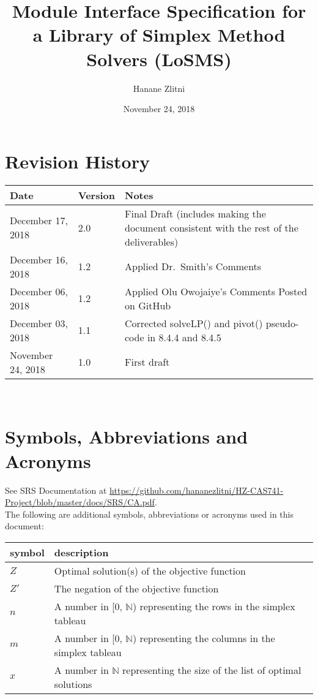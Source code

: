 \documentclass[12pt, titlepage]{article}
\newcommand{\progname}{Library of Simplex Method Solvers}
\newcommand{\famname}{LoSMS}
\begin{document}
\title{Module Interface Specification for a \progname{} (\famname{})}

\author{Hanane Zlitni}

\date{November 24, 2018}

\maketitle


\section{Revision History}

\begin{tabularx}{\textwidth}{p{3cm}p{2cm}X}
\toprule {\bf Date} & {\bf Version} & {\bf Notes}\\
\midrule
December 17, 2018 & 2.0 & Final Draft (includes making the document consistent 
with the rest of the deliverables)\\
December 16, 2018 & 1.2 & Applied Dr.~Smith’s Comments\\
December 06, 2018 & 1.2 & Applied Olu Owojaiye's Comments Posted on GitHub\\
December 03, 2018 & 1.1 & Corrected solveLP() and pivot() pseudo-code in 8.4.4 
and 8.4.5\\
November 24, 2018 & 1.0 & First draft\\
\bottomrule
\end{tabularx}

~\newpage

\section{Symbols, Abbreviations and Acronyms}

See SRS Documentation at 
\url{https://github.com/hananezlitni/HZ-CAS741-Project/blob/master/docs/SRS/CA.pdf}.
 \\

The following are additional symbols, abbreviations or acronyms used in this 
document: \\

\renewcommand{\arraystretch}{1.2}
\begin{tabular}{l l} 
	\toprule		
	\textbf{symbol} & \textbf{description}\\
	\midrule 
	$Z$ & Optimal solution(s) of the objective function\\
	$Z'$ & The negation of the objective function\\
	$n$ & A number in [0, $\mathbb{N}$) representing the rows in the simplex 
	tableau \\
	$m$ & A number in [0, $\mathbb{N}$) representing the columns in the 
	simplex tableau \\
	$x$ & A number in $\mathbb{N}$ representing the size of the list of 
	optimal solutions \\
	\bottomrule
\end{tabular}\\
\end{document}
